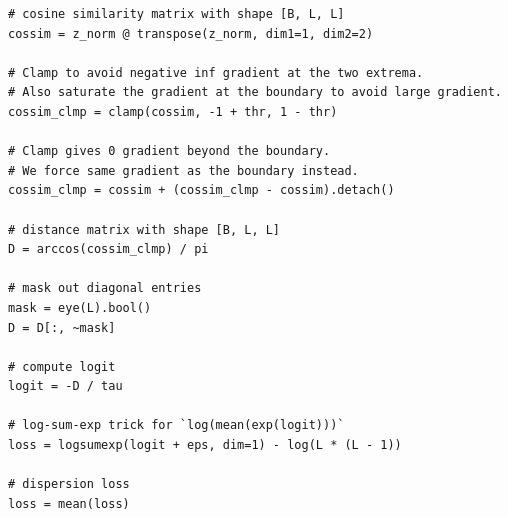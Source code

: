 \documentclass{article}
\theoremstyle{plain}
\theoremstyle{definition}
\theoremstyle{remark}
\begin{document}
\begin{appendices}
\begin{algorithm}[!h]
\begin{lstlisting}[language=PythonFuncColor]
# cosine similarity matrix with shape [B, L, L]
cossim = z_norm @ transpose(z_norm, dim1=1, dim2=2)

# Clamp to avoid negative inf gradient at the two extrema.
# Also saturate the gradient at the boundary to avoid large gradient.
cossim_clmp = clamp(cossim, -1 + thr, 1 - thr)

# Clamp gives 0 gradient beyond the boundary.
# We force same gradient as the boundary instead.
cossim_clmp = cossim + (cossim_clmp - cossim).detach()

# distance matrix with shape [B, L, L]
D = arccos(cossim_clmp) / pi

# mask out diagonal entries
mask = eye(L).bool()
D = D[:, ~mask]

# compute logit
logit = -D / tau

# log-sum-exp trick for `log(mean(exp(logit)))`
loss = logsumexp(logit + eps, dim=1) - log(L * (L - 1))

# dispersion loss
loss = mean(loss)
\end{lstlisting}
\end{algorithm}








\end{appendices}
\end{document}
